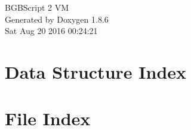 \documentclass[twoside]{book}
\newcommand{\clearemptydoublepage}{%
  \newpage{\pagestyle{empty}\cleardoublepage}%
}
\begin{document}
\hypersetup{pageanchor=false}
\begin{titlepage}
\vspace*{7cm}
\begin{center}%
{\Large B\-G\-B\-Script 2 V\-M }\\
\vspace*{1cm}
{\large Generated by Doxygen 1.8.6}\\
\vspace*{0.5cm}
{\small Sat Aug 20 2016 00:24:21}\\
\end{center}
\end{titlepage}
\clearemptydoublepage
\tableofcontents
\clearemptydoublepage
{}
\hypersetup{pageanchor=true}

\chapter{Data Structure Index}

\chapter{File Index}

\end{document}
